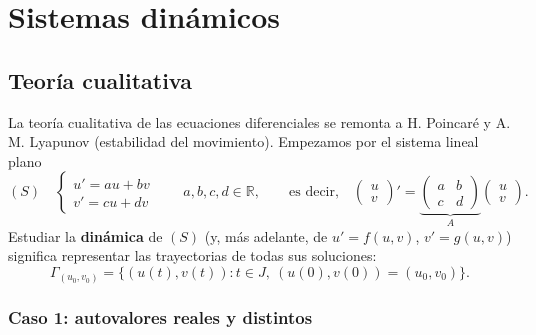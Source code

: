 \section{Sistemas dinámicos}

\subsection{Teoría cualitativa}

La teoría cualitativa de las ecuaciones diferenciales se remonta a H. Poincaré y A. M. Lyapunov (estabilidad del movimiento). Empezamos por el sistema lineal plano
\[
    (S) \quad
    \begin{cases}
        u' = a u + b v \\
        v' = c u + d v
    \end{cases}
    \qquad a, b, c, d \in \mathbb{R},
    \qquad \text{es decir,} \quad
    \begin{pmatrix} u \\ v \end{pmatrix}' = \underbrace{\begin{pmatrix} a & b \\ c & d \end{pmatrix}}_{A} \begin{pmatrix} u \\ v \end{pmatrix}.
\]
Estudiar la \textbf{dinámica} de $(S)$ (y, más adelante, de $u' = f(u, v)$, $v' = g(u, v)$) significa representar las trayectorias de todas sus soluciones:
\[
    \Gamma_{(u_0, v_0)} = \{ (u(t), v(t)) : t \in J, \ (u(0), v(0)) = (u_0, v_0) \}.
\]

\subsubsection{Caso 1: autovalores reales y distintos}

